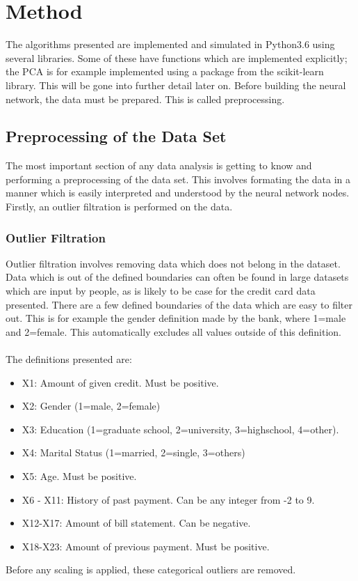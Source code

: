 \section{Method}
    The algorithms presented are implemented and simulated in Python3.6 using several libraries. Some of these have functions which are implemented explicitly; the PCA is for example implemented using a package from the scikit-learn library. This will be gone into further detail later on. Before building the neural network, the data must be prepared. This is called preprocessing.
    \subsection{Preprocessing of the Data Set}
        The most important section of any data analysis is getting to know and performing a preprocessing of the data set. This involves formating the data in a manner which is easily interpreted and understood by the neural network nodes. Firstly, an outlier filtration is performed on the data.
        \subsubsection{Outlier Filtration}
            Outlier filtration involves removing data which does not belong in the dataset. Data which is out of the defined boundaries can often be found in large datasets which are input by people, as is likely to be case for the credit card data presented. There are a few defined boundaries of the data which are easy to filter out. This is for example the gender definition made by the bank, where 1=male and 2=female. This automatically excludes all values outside of this definition.\\\\
            The definitions presented are:
            \begin{itemize}
                \item X1: Amount of given credit. Must be positive.
                \item X2: Gender (1=male, 2=female)
                \item X3: Education (1=graduate school, 2=university, 3=highschool, 4=other).
                \item X4: Marital Status (1=married, 2=single, 3=others)
                \item X5: Age. Must be positive.
                \item X6 - X11: History of past payment. Can be any integer from -2 to 9.
                \item X12-X17: Amount of bill statement. Can be negative.
                \item X18-X23: Amount of previous payment. Must be positive.
            \end{itemize}
            Before any scaling is applied, these categorical outliers are removed.
